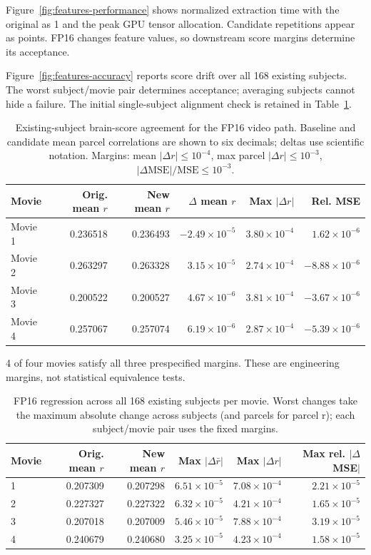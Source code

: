 Figure~\ref{fig:features-performance} shows normalized extraction time with the original as 1 and the peak GPU tensor allocation. Candidate repetitions appear as points. FP16 changes feature values, so downstream score margins determine its acceptance.

Figure~\ref{fig:features-accuracy} reports score drift over all 168 existing subjects. The worst subject/movie pair determines acceptance; averaging subjects cannot hide a failure. The initial single-subject alignment check is retained in Table~\ref{tab:features-accuracy}.

\begin{table}[htbp]\centering\sffamily\small
\caption{Existing-subject brain-score agreement for the FP16 video path. Baseline and candidate mean parcel correlations are shown to six decimals; deltas use scientific notation. Margins: mean $|\Delta r| \leq 10^{-4}$, max parcel $|\Delta r| \leq 10^{-3}$, $|\Delta \mathrm{MSE}|/\mathrm{MSE} \leq 10^{-3}$.}\label{tab:features-accuracy}
\begin{tabular}{@{}lrrrrr@{}}\toprule
Movie & Orig. mean $r$ & New mean $r$ & $\Delta$ mean $r$ & Max $|\Delta r|$ & Rel. MSE \\\midrule
Movie 1 & 0.236518 & 0.236493 & $-2.49\times10^{-5}$ & $3.80\times10^{-4}$ & $1.62\times10^{-6}$ \\
Movie 2 & 0.263297 & 0.263328 & $3.15\times10^{-5}$ & $2.74\times10^{-4}$ & $-8.88\times10^{-6}$ \\
Movie 3 & 0.200522 & 0.200527 & $4.67\times10^{-6}$ & $3.81\times10^{-4}$ & $-3.67\times10^{-6}$ \\
Movie 4 & 0.257067 & 0.257074 & $6.19\times10^{-6}$ & $2.87\times10^{-4}$ & $-5.39\times10^{-6}$ \\
\bottomrule\end{tabular}\end{table}

4 of four movies satisfy all three prespecified margins. These are engineering margins, not statistical equivalence tests.

\begin{table}[htbp]\centering\sffamily\small
\caption{FP16 regression across all 168 existing subjects per movie. Worst changes take the maximum absolute change across subjects (and parcels for parcel r); each subject/movie pair uses the fixed margins.}\label{tab:cohort}
\begin{tabular}{@{}lrrrrr@{}}\toprule
Movie & Orig. mean $r$ & New mean $r$ & Max $|\Delta\bar r|$ & Max $|\Delta r|$ & Max rel. $|\Delta$MSE$|$ \\\midrule
1 & 0.207309 & 0.207298 & $6.51\times10^{-5}$ & $7.08\times10^{-4}$ & $2.21\times10^{-5}$ \\
2 & 0.227327 & 0.227322 & $6.32\times10^{-5}$ & $4.21\times10^{-4}$ & $1.65\times10^{-5}$ \\
3 & 0.207018 & 0.207009 & $5.46\times10^{-5}$ & $7.88\times10^{-4}$ & $3.19\times10^{-5}$ \\
4 & 0.240679 & 0.240680 & $3.25\times10^{-5}$ & $4.23\times10^{-4}$ & $1.58\times10^{-5}$ \\
\bottomrule\end{tabular}\end{table}

